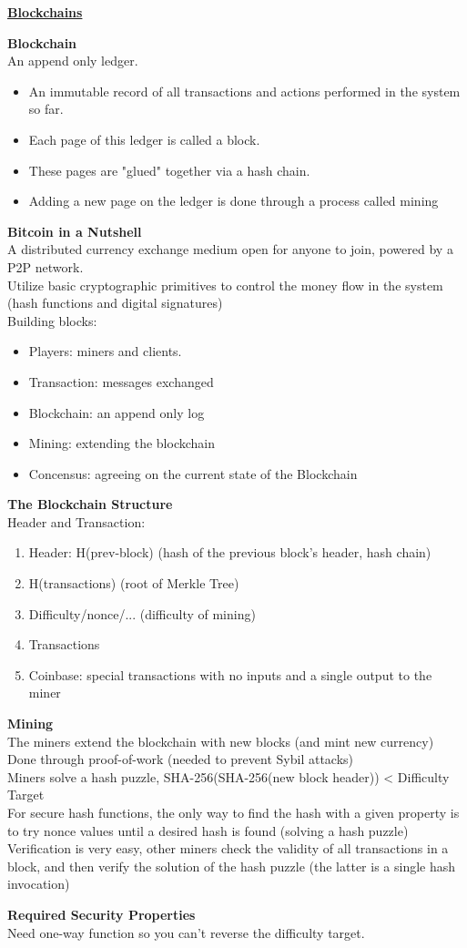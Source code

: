 \documentclass{article}
\begin{document}
\textbf{\underline{Blockchains}}

\textbf{Blockchain}\\
An append only ledger.\begin{itemize}
	\item An immutable record of all transactions and actions performed in the system so far.
	\item Each page of this ledger is called a block.
	\item These pages are "glued" together via a hash chain.
	\item Adding a new page on the ledger is done through a process called mining
\end{itemize}

\textbf{Bitcoin in a Nutshell}\\
A distributed currency exchange medium open for anyone to join, powered by a P2P network.\\
Utilize basic cryptographic primitives to control the money flow in the system (hash functions and digital signatures)\\
Building blocks:\begin{itemize}
	\item Players: miners and clients.
	\item Transaction: messages exchanged
	\item Blockchain: an append only log
	\item Mining: extending the blockchain
	\item Concensus: agreeing on the current state of the Blockchain
\end{itemize}

\textbf{The Blockchain Structure}\\
Header and Transaction:
\begin{enumerate}
	\item Header: H(prev-block) (hash of the previous block's header, hash chain)
	\item H(transactions) (root of Merkle Tree)
	\item Difficulty/nonce/... (difficulty of mining)
	\item Transactions
	\item Coinbase: special transactions with no inputs and a single output to the miner
\end{enumerate}

\textbf{Mining}\\
The miners extend the blockchain with new blocks (and mint new currency)\\
Done through proof-of-work (needed to prevent Sybil attacks)\\
Miners solve a hash puzzle, SHA-256(SHA-256(new block header)) < Difficulty Target\\
For secure hash functions, the only way to find the hash with a given property is to try nonce values until a desired hash is found (solving a hash puzzle)\\
Verification is very easy, other miners check the validity of all transactions in a block, and then verify the solution of the hash puzzle (the latter is a single hash invocation)

\textbf{Required Security Properties}\\
Need one-way function so you can't reverse the difficulty target.
\end{document}
